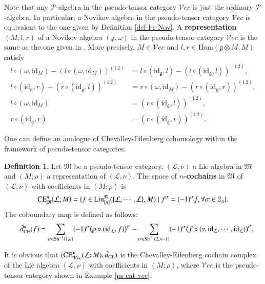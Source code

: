 \documentclass[12pt]{amsart}
\theoremstyle{definition}
\newtheorem{defi}[thm]{Definition}
\newcommand{\g}{\mathfrak g}
\newcommand{\huaL}{\mathcal{L}}
\newcommand{\huaV}{\mathcal{V}}
\newcommand{\frkM}{\mathfrak M}
\newcommand{\id}{\mathrm{id}}
\newcommand{\Hom}{\mathrm{Hom}}
\newcommand{\ot}{\otimes}
\newcommand{\s}{\mathbb{S}}
\newcommand{\Sh}{{\rm Sh}}
\newcommand{\ce}{{\rm CE}}
\newcommand{\lin}{{\rm Lin}}
\newcommand{\cc}{\circ}
\begin{document}
Note that any  $\mathcal{P}$-algebra in the pseudo-tensor category $\mathcal{V}ec$ is just the ordinary $\mathcal{P}$-algebra. In particular, a Novikov algebra in the pseudo-tensor category $\mathcal{V}ec$ is equivalent to the one given by Definition \ref{def-l-r-Nov}. A \textbf{representation} $(M;l,r)$ of a Novikov algebra $(\g, \omega)$ in the pseudo-tensor category $\mathcal{V}ec$ is the same as the one given in \cite{O1995}. More precisely, $M\in \mathcal{V}ec$ and $l,r\in \Hom(\g\ot M,M)$ satisfy
\begin{align}
	l\cc(\omega,\id_M)-(l\cc(\omega,\id_M))^{(1\,2)}&=l\cc(\id_\g, l) - (l\cc(\id_\g, l))^{(1\,2)},\label{Nov-rep-1}\\
	l\cc(\id_\g, r) - (r\cc(\id_\g, l))^{(1\,2)}&=r\cc(\omega,\id_M)-(r\cc(\id_\g, r))^{(1\,2)},\label{Nov-rep-2}\\
	l\cc(\omega,\id_M)&=(r\cc(\id_\g, l))^{(1\,2)},\label{Nov-rep-3}\\
	r\cc(\id_\g, r)&=(r\cc(\id_\g, r))^{(1\,2)}.\label{Nov-rep-4}
\end{align}

 



One can define an analogue of Chevalley-Eilenberg cohomology within the framework of pseudo-tensor categories.

\begin{defi}\cite{BKV}\label{CE-comp-wrt-mod}
Let $\frkM$ be a pseudo-tensor category, $(\huaL,\nu)$ a Lie algebra in $\frkM$ and $(M;\rho)$ a representation of $(\huaL,\nu)$.
The space of {\bf $n$-cochains} in $\frkM$ of $(\huaL,\nu)$ with coefficients in $(M;\rho)$ is $$\ce_\frkM^n(\huaL;M)=\{f\in\lin_{[n]}^\frkM(\{\huaL,\cdots,\huaL\},M)\mid f^\sigma=(-1)^\sigma f,  \forall \sigma\in \s_n\}.$$
The coboundary map is defined as follows:
\begin{eqnarray}\label{dce-coeff}
 	&&\hat{d}_{\rm CE}^n(f)=\underset{\sigma\in\Sh^{-1}(1,n)}{\sum}(-1)^{\sigma}\big(\rho\cc(\id_\huaL,f)\big)^{\sigma}-\underset{\sigma\in\Sh^{-1}(2,n-1)}{\sum}(-1)^{\sigma}\big(f\cc(\nu,\id_\huaL,\cdots,\id_\huaL)\big)^{\sigma}.
 \end{eqnarray}
\end{defi}

It is obvious that $(\ce^\bullet_{\huaV ec}(\huaL;M),\hat{d}_\ce)$ is the Chevalley-Eilenberg cochain complex of the Lie algebra $(\huaL,\nu)$ with coefficients in $(M;\rho)$, where $\huaV ec$ is the pseudo-tensor category shown in Example \ref{ps-cat-vec}.
\end{document}
